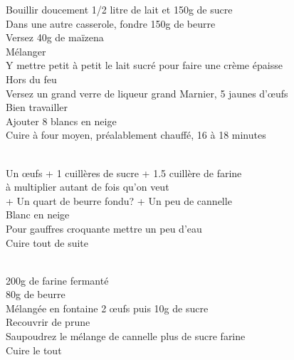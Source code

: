 \begin{minipage}[c]{\textwidth}
Bouillir doucement 1/2 litre de lait et 150g de sucre\\
Dans une autre casserole, fondre 150g de beurre\\
Versez 40g de maïzena\\
Mélanger\\
Y mettre petit à petit le lait sucré pour faire une crème épaisse\\
Hors du feu\\
Versez un grand verre de liqueur grand Marnier, 5 jaunes d'œufs\\
Bien travailler\\
Ajouter 8 blancs en neige\\
Cuire à four moyen, préalablement chauffé, 16 à 18 minutes\\
\\

\end{minipage}

\begin{minipage}[c]{\textwidth}
Un œufs + 1 cuillères de sucre + 1.5 cuillère de farine\\
à multiplier autant de fois qu'on veut\\
+ Un quart de beurre fondu? + Un peu de cannelle\\
Blanc en neige\\
Pour gauffres croquante mettre un peu d'eau\\
Cuire tout de suite\\
\\

\end{minipage}

\begin{minipage}[c]{\textwidth}
200g de farine fermanté\\
80g de beurre\\
Mélangée en fontaine 2 œufs puis 10g de sucre\\
Recouvrir de prune\\
Saupoudrez le mélange de cannelle plus de sucre farine\\
Cuire le tout\\
\\

\end{minipage}

